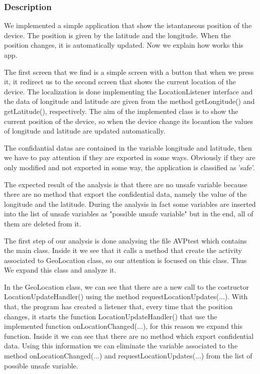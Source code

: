 \documentclass[letterpaper,twocolumn,10pt]{article}
\begin{document}
\subsubsection{Description}
We implemented a simple application that show the istantaneous position of the device. The position is given by the latitude and the longitude. When the position changes, it is automatically updated. Now we explain how works this app.

The first screen that we find is a simple screen with a button that when we press it, it redirect us to the second screen that shows the current location of the device. The localization is done implementing the LocationListener interface and the data of longitude and latitude are given from the method getLongitude() and getLatitude(), respectively. The aim of the implemented class is to show the current position of the device, so when the device change its locantion the values of longitude and latitude are updated automatically. 

The confidantial datas are contained in the variable longitude and latitude, then we have to pay attention if they are exported in some ways. Obviously if they are only modified and not exported in some way, the application is classified as 'safe'.

The expected result of the analysis is that there are no unsafe variable because there are no method that export the confidential data, namely the value of the longitude and the latitude. During the analysis in fact some variables are inserted into the list of unsafe variables as "possible unsafe variable" but in the end, all of them are deleted from it. 

The first step of our analysis is done analysing the file AVPtest which contains the main class. Inside it we see that it calls a method that create the activity associated to GeoLocation class, so our attention is focused on this class. Thus We expand this class and analyze it.

In the GeoLocation class, we can see that there are a new call to the costructor LocationUpdateHandler() using the method requestLocationUpdates(...). With that, the program has created a listener that, every time that the position changes, it starts the function LocationUpdateHandler() that use the implemented function onLocationChanged(...), for this reason we expand this function. Inside it we can see that there are no method which export confidential data. Using this information we can eliminate the variable associated to the method onLocationChanged(...) and requestLocationUpdates(...) from the list of possible unsafe variable.
\end{document}
